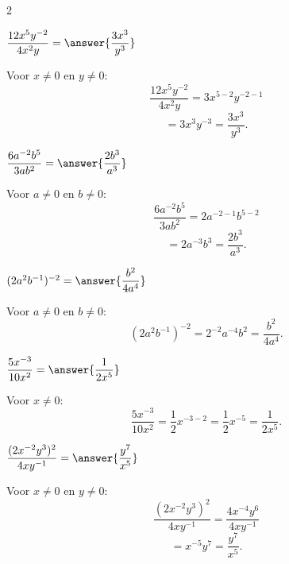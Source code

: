 \documentclass{ximera}
\begin{document}
\begin{oefening}[Machten]{\oefB\ESS}
\begin{multicols}{2}
    
    \begin{question}
    $\dfrac{12x^5y^{-2}}{4x^2y}
    =\answer{\dfrac{3x^3}{y^3}}$
    
    \begin{oplossing}
    Voor $x\neq0$ en $y\neq0$:
    \[
    \dfrac{12x^5y^{-2}}{4x^2y}
    =3x^{5-2}y^{-2-1}
    \]
    \[
    =3x^3y^{-3}
    =\dfrac{3x^3}{y^3}.
    \]
    \end{oplossing}
    \end{question}
    
    
    \begin{question}
    $\dfrac{6a^{-2}b^5}{3ab^2}
    =\answer{\dfrac{2b^3}{a^3}}$
    
    \begin{oplossing}
    Voor $a\neq0$ en $b\neq0$:
    \[
    \dfrac{6a^{-2}b^5}{3ab^2}
    =2a^{-2-1}b^{5-2}
    \]
    \[
    =2a^{-3}b^3
    =\dfrac{2b^3}{a^3}.
    \]
    \end{oplossing}
    \end{question}
    
    
    \begin{question}
    $(2a^2b^{-1})^{-2}
    =\answer{\dfrac{b^2}{4a^4}}$
    
    \begin{oplossing}
    Voor $a\neq0$ en $b\neq0$:
    \[
    (2a^2b^{-1})^{-2}
    =2^{-2}a^{-4}b^2
    =\dfrac{b^2}{4a^4}.
    \]
    \end{oplossing}
    \end{question}
    
    
    \begin{question}
    $\dfrac{5x^{-3}}{10x^2}
    =\answer{\dfrac{1}{2x^5}}$
    
    \begin{oplossing}
    Voor $x\neq0$:
    \[
    \dfrac{5x^{-3}}{10x^2}
    =\dfrac12x^{-3-2}
    =\dfrac12x^{-5}
    =\dfrac{1}{2x^5}.
    \]
    \end{oplossing}
    \end{question}
    
    
    \begin{question}
    $\dfrac{(2x^{-2}y^3)^2}{4xy^{-1}}
    =\answer{\dfrac{y^7}{x^5}}$
    
    \begin{oplossing}
    Voor $x\neq0$ en $y\neq0$:
    \[
    \dfrac{(2x^{-2}y^3)^2}{4xy^{-1}}
    =\dfrac{4x^{-4}y^6}{4xy^{-1}}
    \]
    \[
    =x^{-5}y^7
    =\dfrac{y^7}{x^5}.
    \]
    \end{oplossing}
    \end{question}
    
    \end{multicols}
    
    \end{oefening}
\end{document}
